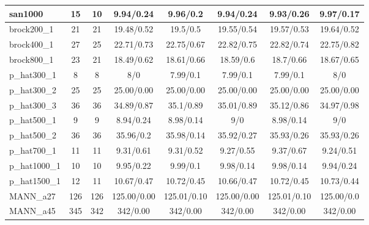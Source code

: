\documentclass[11pt]{article}
\begin{document}
\begin{table*}[ht!]
\begin{footnotesize}
\begin{center}
\begin{tabular}{|l||c|c||c|c|c|c|c|}
san1000 	    &15 &10  &9.94/0.24 &9.96/0.2 &9.94/0.24 &9.93/0.26 &9.97/0.17\\
\hline
brock200\_1 	&21 &21  &19.48/0.52 &19.5/0.5 &19.55/0.54 &19.57/0.53 &19.64/0.52\\
brock400\_1 	&27 &25  &22.71/0.73 &22.75/0.67 &22.82/0.75 &22.82/0.74 &22.75/0.82\\
brock800\_1 	&23 &21  & 18.49/0.62 &18.61/0.66 &18.59/0.6 &18.7/0.66 &18.67/0.65\\
\hline
p\_hat300\_1 	&8 	&8   &8/0 &7.99/0.1 &7.99/0.1 &7.99/0.1 &8/0\\
p\_hat300\_2 	&25	&25  &25.00/0.00 &25.00/0.00 &25.00/0.00 &25.00/0.00 &25.00/0.00\\
p\_hat300\_3 	&36 &36  &34.89/0.87 &35.1/0.89 &35.01/0.89 &35.12/0.86 &34.97/0.98\\
p\_hat500\_1 	&9 	&9   &8.94/0.24 &8.98/0.14 &9/0 &8.98/0.14 &9/0 \\
p\_hat500\_2 	&36 &36  &35.96/0.2 &35.98/0.14 &35.92/0.27 &35.93/0.26 &35.93/0.26\\
p\_hat700\_1 	&11 &11  &9.31/0.61 &9.31/0.52 &9.27/0.55 &9.37/0.67 &9.24/0.51\\
p\_hat1000\_1 	&10 &10  &9.95/0.22 &9.99/0.1 &9.98/0.14 &9.98/0.14 &9.94/0.24\\
p\_hat1500\_1 	&12 &11	 &10.67/0.47 &10.72/0.45 &10.66/0.47 &10.72/0.45 &10.73/0.44\\
\hline
MANN\_a27 	&126 &126 &125.00/0.00 &125.01/0.10 &125.00/0.00 &125.01/0.10 &125.00/0.0\\
MANN\_a45 	&345 &342 &342/0.00 &342/0.00 &342/0.00 &342/0.00 &342/0.00 \\
\hline
\end{tabular}
\end{center}
\end{footnotesize}
\end{table*}
\linespread{1.3}
\end{document}
